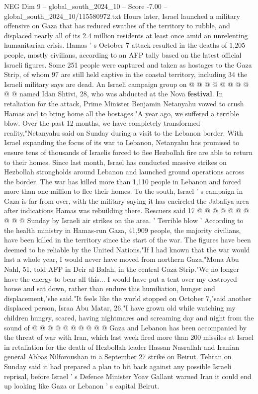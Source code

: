 \begin{textsample}{NEG Dim 9 – global\_south\_2024\_10 – Score -7.00 – global\_south\_2024\_10/115580972.txt}
Hours later, Israel launched a military offensive on Gaza that has reduced swathes of the territory to rubble, and displaced nearly all of its 2.4 million residents at least once amid an unrelenting humanitarian crisis.
Hamas ' s October 7 attack resulted in the deaths of 1,205 people, mostly civilians, according to an AFP tally based on the latest official Israeli figures.
Some 251 people were captured and taken as hostages to the Gaza Strip, of whom 97 are still held captive in the coastal territory, including 34 the Israeli military says are dead.
An Israeli campaign group on @ @ @ @ @ @ @ @ @ @ named Idan Shtivi, 28, who was abducted at the Nova \textbf{festival}.
In retaliation for the attack, Prime Minister Benjamin Netanyahu vowed to crush Hamas and to bring home all the hostages."A year ago, we suffered a terrible blow.
Over the past 12 months, we have completely transformed reality,"Netanyahu said on Sunday during a visit to the Lebanon border.
With Israel expanding the focus of its war to Lebanon, Netanyahu has promised to ensure tens of thousands of Israelis forced to flee Hezbollah fire are able to return to their homes.
Since last month, Israel has conducted massive strikes on Hezbollah strongholds around Lebanon and launched ground operations across the border.
The war has killed more than 1,110 people in Lebanon and forced more than one million to flee their homes.
To the south, Israel ' s campaign in Gaza is far from over, with the military saying it has encircled the Jabaliya area after indications Hamas was rebuilding there.
Rescuers said 17 @ @ @ @ @ @ @ @ @ @ Sunday by Israeli air strikes on the area. ' Terrible blow ' According to the health ministry in Hamas-run Gaza, 41,909 people, the majority civilians, have been killed in the territory since the start of the war.
The figures have been deemed to be reliable by the United Nations."If I had known that the war would last a whole year, I would never have moved from northern Gaza,"Mona Abu Nahl, 51, told AFP in Deir al-Balah, in the central Gaza Strip."We no longer have the energy to bear all this...
I would have put a tent over my destroyed house and sat down, rather than endure this humiliation, hunger and displacement,"she said."It feels like the world stopped on October 7,"said another displaced person, Israa Abu Matar, 26."I have grown old while watching my children hungry, scared, having nightmares and screaming day and night from the sound of @ @ @ @ @ @ @ @ @ @ Gaza and Lebanon has been accompanied by the threat of war with Iran, which last week fired more than 200 missiles at Israel in retaliation for the death of Hezbollah leader Hassan Nasrallah and Iranian general Abbas Nilforoushan in a September 27 strike on Beirut.
Tehran on Sunday said it had prepared a plan to hit back against any possible Israeli reprisal, before Israel ' s Defence Minister Yoav Gallant warned Iran it could end up looking like Gaza or Lebanon ' s capital Beirut.

\end{textsample}
